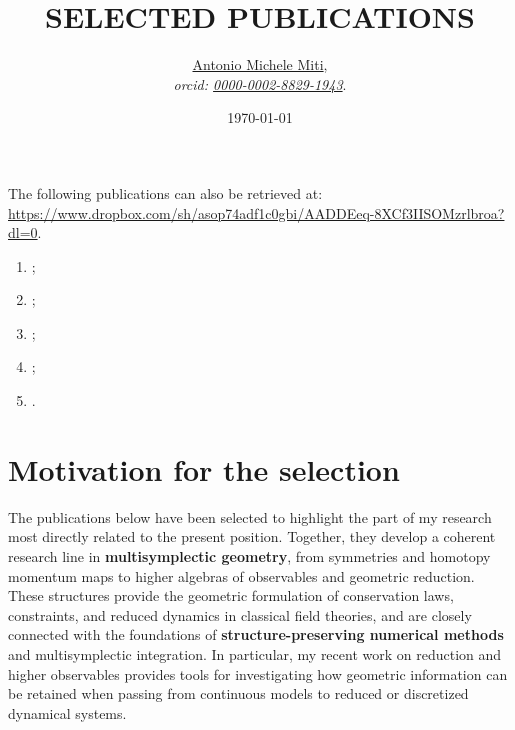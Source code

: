 \documentclass[a4paper]{article}
\title{SELECTED PUBLICATIONS}
\date{\today}
\author{
	\href{www.antoniomiti.it}{Antonio Michele Miti},\\
	\emph{orcid: \href{https://orcid.org/0000-0002-8829-1943}
	{0000-0002-8829-1943}}.
}
\begin{document}


\maketitle

\noindent
The following publications can also be retrieved at:
\\
\url{https://www.dropbox.com/sh/asop74adf1c0gbi/AADDEeq-8XCf3IISOMzrlbroa?dl=0}.



\begin{enumerate}
	\item {};
	\item {};
	\item {};
	\item {};
	\item {}.
\end{enumerate}

\section*{Motivation for the selection}

The publications below have been selected to highlight the part of my research
most directly related to the present position. Together, they develop a coherent
research line in \textbf{multisymplectic geometry}, from symmetries and homotopy
momentum maps to higher algebras of observables and geometric reduction.
These structures provide the geometric formulation of conservation laws,
constraints, and reduced dynamics in classical field theories, and are closely
connected with the foundations of \textbf{structure-preserving numerical methods}
and multisymplectic integration. In particular, my recent work on reduction and
higher observables provides tools for investigating how geometric information
can be retained when passing from continuous models to reduced or discretized
dynamical systems.
\end{document}
